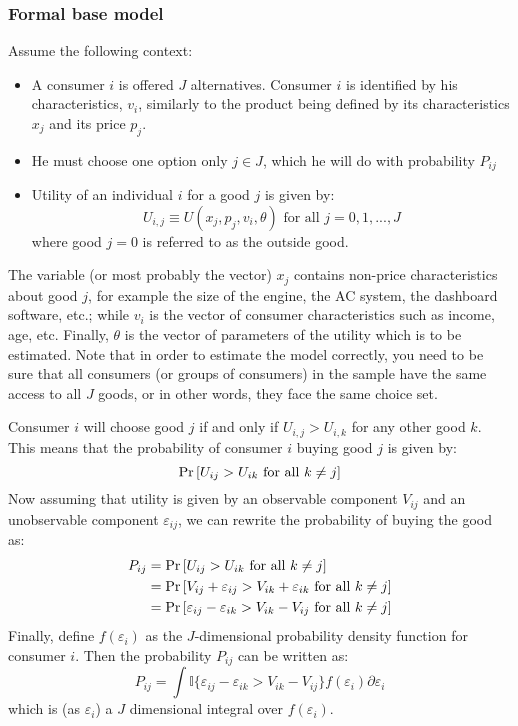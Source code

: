 \subsubsection{Formal base model}

Assume the following context:\begin{itemize}
\item A consumer $i$ is offered $J$ alternatives. Consumer $i$ is identified by his characteristics, $v_i$, similarly to the product being defined by its characteristics $x_j$ and its price $p_j$.
\item He must choose one option only $j\in J$, which he will do with probability $P_{ij}$
\item Utility of an individual $i$ for a good $j$ is given by: $$U_{i,j} \equiv U(x_j, p_j, v_i, \theta) \text{ for all } j = 0, 1, ..., J $$ where good $j =0$ is referred to as the outside good.
\end{itemize}  The variable (or most probably the vector) $x_j$ contains non-price characteristics about good $j$, for example the size of the engine, the AC system, the dashboard software, etc.; while $v_i$ is the vector of consumer characteristics such as income, age, etc. Finally, $\theta$ is the vector of parameters of the utility which is to be estimated. Note that in order to estimate the model correctly, you need to be sure that all consumers (or groups of consumers) in the sample have the same access to all $J$ goods, or in other words, they face the same choice set.

Consumer $i$ will choose good $j$ if and only if $U_{i,j} > U_{i, k}$ for any other good $k$. This means that the probability of consumer $i$ buying good $j$ is given by: $$\operatorname{Pr}\left[U_{ij}>U_{ik}\text{ for all } k\neq j\right] $$ Now assuming that utility is given by an observable component $V_{ij}$ and an unobservable component $\varepsilon_{ij}$, we can rewrite the probability of buying the good as: \begin{align*} P_{ij} & = \operatorname{Pr}\left[U_{ij}>U_{ik}\text{ for all } k\neq j\right] \\
& = \operatorname{Pr}\left[V_{ij}+\varepsilon_{ij}>V_{ik}+\varepsilon_{ik}\text{ for all } k\neq j\right] \\
& = \operatorname{Pr}\left[\varepsilon_{ij} - \varepsilon_{ik} > V_{ik} - V_{ij} \text{ for all } k\neq j\right]
\end{align*} Finally, define $f(\varepsilon_i)$ as the $J$-dimensional probability density function for consumer $i$. Then the probability $P_{ij}$ can be written as: $$P_{ij} = \int \mathbb{I}\{\varepsilon_{ij} - \varepsilon_{ik} > V_{ik} - V_{ij}\}f(\varepsilon_i)\partial \varepsilon_i $$ which is (as $\varepsilon_i$) a $J$ dimensional integral over $f(\varepsilon_i)$.

